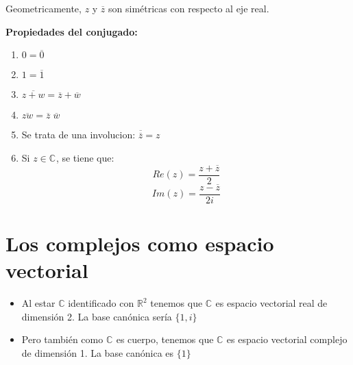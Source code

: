 Geometricamente, \(z\) y \(\overline{z}\) son simétricas con respecto al eje real.

\begin{center} %
\end{center}

\textbf{Propiedades del conjugado:}

\begin{enumerate}
  \item \(0 = \overline{0}\)
  \item \(1 = \overline{1}\)
  \item \(\overline{z+w} = \overline{z}+\overline{w}\)
  \item \(\overline{zw} = \overline{z} \; \overline{w}\)
  \item Se trata de una involucion: \(\overline{\overline{z}} = z\)
  \item Si \(z \in \mathbb{C}^{}\), se tiene que:
    \[ Re(z) = \frac{z+\overline{z}}{2}\]
    \[Im(z) = \frac{z-\overline{z}}{2i}\]
\end{enumerate}

\section{Los complejos como espacio vectorial}

\begin{itemize}
  \item Al estar \(\mathbb{C}\) identificado con \(\mathbb{R}^{2}\) tenemos que \(\mathbb{C}^{}\) es espacio vectorial real de dimensión 2.
  La base canónica sería \(\{1,i\}\)
  \item Pero también como \(\mathbb{C}^{}\) es cuerpo, tenemos que \(\mathbb{C}^{}\) es espacio vectorial complejo de dimensión 1.
  La base canónica es \(\{1\}\)
\end{itemize}

